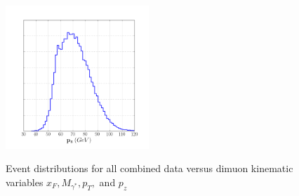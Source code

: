 \begin{figure}
	\includegraphics[width=0.48\textwidth]{figures/results/pz-dist.png} \\
	\caption{Event distributions for all combined data versus dimuon kinematic variables $x_F, M_{\gamma^*}, p_T,$ and $p_z$}
	\label{fig:event-dist1}
\end{figure}

